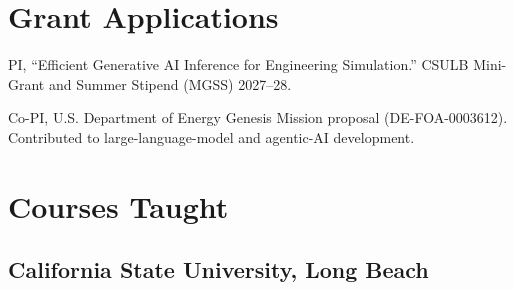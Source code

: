 \documentclass[11pt,letterpaper]{report}
\begin{document}








    \section*{Grant Applications}

    \begin{tablist}

        \item[2026] \tab{} PI, \enquote{Efficient Generative AI Inference for Engineering Simulation.} CSULB Mini-Grant and Summer Stipend (MGSS) 2027--28.

        \item[2026] \tab{} Co-PI, U.S. Department of Energy Genesis Mission proposal (DE-FOA-0003612). Contributed to large-language-model and agentic-AI development.
    \end{tablist}

    \section*{Courses Taught}

    \subsection*{California State University, Long Beach}
\end{document}
